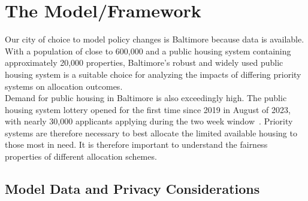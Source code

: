 \documentclass[11pt]{article}
\begin{document}
\section{The Model/Framework}
\noindent
Our city of choice to model policy changes is Baltimore because data is available. With a population of close to 600,000 and a public housing system containing approximately 20,000 properties, Baltimore's robust and widely used public housing system is a suitable choice for analyzing the impacts of differing priority systems on allocation outcomes. \\
\newline
Demand for public housing in Baltimore is also exceedingly high. The public housing system lottery opened for the first time since 2019 in August of 2023, with nearly 30,000 applicants applying during the two week window~\cite{emily_hofstaedter_28000_nodate}. Priority systems are therefore necessary to best allocate the limited available housing to those most in need.  It is therefore important to understand the fairness properties of different allocation schemes. \\

\subsection{Model Data and Privacy Considerations}
\end{document}
